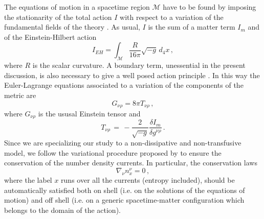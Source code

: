 \documentclass[usenatbib]{mnras}
\begin{document}
The equations of motion in a spacetime region $\mathcal{M}$ have to be found by imposing the stationarity of the total action $I$ with respect to a variation of the fundamental fields of the theory \citep{noto_rel}. As usual, $I$ is the sum of a matter term $I_m$ and of the Einstein-Hilbert action
%
\begin{equation}
I_{EH} = \int_\mathcal{M} \dfrac{R}{16 \pi} \sqrt{-g} \, d_4 x \, ,
\end{equation}
%
where $R$ is the scalar curvature. A boundary term, unessential in the present discussion, is also necessary to give a well posed action principle \citep[see e.g. ][]{andersson2007review}. In this way the Euler-Lagrange equations associated to a variation of the components of the metric are
%
\begin{equation}
G_{\nu \rho} = 8 \pi T_{\nu \rho} \, ,
\end{equation} 
%
where $G_{\nu \rho}$ is the ususal Einstein tensor and
%
\begin{equation}
T_{ \nu\rho} \, = \, -\dfrac{2}{\sqrt{-g}} \dfrac{\delta I_m}{\delta g^{ \nu \rho}} \, .
\end{equation}
%
Since we are specializing our study to a non-dissipative and non-transfusive model, we follow the variational procedure proposed by \cite{Comer_1993} to ensure the conservation of the number density currents. In particular, the conservation laws
%
\begin{equation}
\label{continuityyyy}
\nabla_\nu n_x^\nu=0 \, ,
\end{equation}
%
where the label $x$ runs over all the currents (entropy included), should be automatically satisfied both on shell (i.e. on the solutions of the equations of motion) and off shell (i.e. on a generic spacetime-matter configuration which belongs to the domain of the action). 
\end{document}
